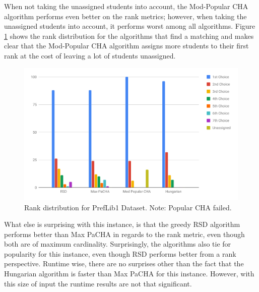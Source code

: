 When not taking the unassigned students into account, the Mod-Popular CHA algorithm performs even better on the rank metrics; however, when taking the unassigned students into account, it performs worst among all algorithms. Figure \ref{fig:preflib1-rank-distribution} shows the rank distribution for the algorithms that find a matching and makes clear that the Mod-Popular CHA algorithm assigns more students to their first rank at the cost of leaving a lot of students unassigned. 

\begin{figure}[h!]
  \centering
    \includegraphics[width=0.9\linewidth]{assets/plots/preflib1-ranks.pdf}    
    \caption{Rank distribution for PrefLib1 Dataset. Note: Popular CHA failed.}
    \label{fig:preflib1-rank-distribution}
\end{figure}

What else is surprising with this instance, is that the greedy RSD algorithm performs better than Max PaCHA in regards to the rank metric, even though both are of maximum cardinality. Surprisingly, the algorithms also tie for popularity for this instance, even though RSD performs better from a rank perspective. Runtime wise, there are no surprises other than the fact that the Hungarian algorithm is faster than Max PaCHA for this instance. However, with this size of input the runtime results are not that significant.

